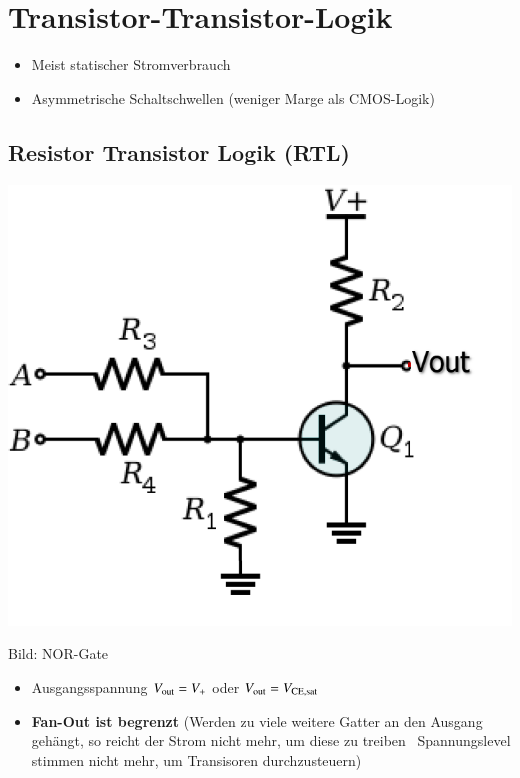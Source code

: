\section{Transistor-Transistor-Logik}

\begin{itemize}
    \item Meist statischer Stromverbrauch
    \item Asymmetrische Schaltschwellen (weniger Marge als CMOS-Logik)
\end{itemize}


\subsection{Resistor Transistor Logik (RTL)}

\begin{minipage}[c]{0.27\columnwidth}
    \includegraphics[width=\columnwidth]{images/rtl_nor.png}
\end{minipage}
\hfill
\begin{minipage}[c]{0.68\columnwidth}
    Bild: NOR-Gate

    \begin{itemize}
        \item Ausgangsspannung $V_{\rm out} = V_+$ oder $V_{\rm out} = V_{\rm CE,sat}$
        \item \textbf{Fan-Out ist begrenzt} (Werden zu viele weitere Gatter an den Ausgang gehängt, so reicht der Strom nicht mehr,
             um diese zu treiben \textrightarrow\ Spannungslevel stimmen nicht mehr, um Transisoren durchzusteuern)
    \end{itemize}
\end{minipage}


